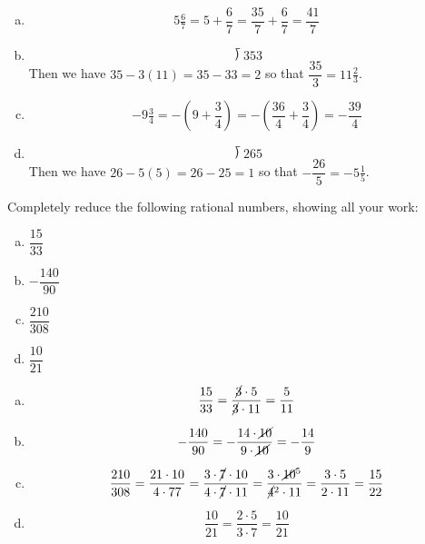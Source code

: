 \documentclass[11pt,letterpaper]{article}
\begin{document}
\sol
\begin{enumerate}[(a)]
\item 
	\[
	5 \tfrac{6}{7}= 5 + \dfrac{6}{7}= \dfrac{35}{7} + \dfrac{6}{7}= \dfrac{41}{7}
	\] \pspace

\item 
	\[
	\longdivision{35}{3}
	\] 
Then we have $35 - 3(11)= 35 - 33= 2$ so that $\dfrac{35}{3}= 11 \tfrac{2}{3}$. \pspace

\item 
	\[
	-9 \tfrac{3}{4}= -\left( 9 + \dfrac{3}{4} \right)= -\left( \dfrac{36}{4} + \dfrac{3}{4} \right)= -\dfrac{39}{4}
	\] \pspace

\item 
	\[
	\longdivision{26}{5}
	\] 
Then we have $26 - 5(5)= 26 - 25= 1$ so that $-\dfrac{26}{5}= -5 \tfrac{1}{5}$.
\end{enumerate}



\newpage



 Completely reduce the following rational numbers, showing all your work:
	\begin{enumerate}[(a)]
	\item $\dfrac{15}{33}$
	\item $-\dfrac{140}{90}$
	\item $\dfrac{210}{308}$
	\item $\dfrac{10}{21}$
	\end{enumerate} \pspace

\sol
\begin{enumerate}[(a)]
\item 
	\[
	\dfrac{15}{33}= \dfrac{\cancel{3} \cdot 5}{\cancel{3} \cdot 11}= \dfrac{5}{11}
	\] \pspace

\item 
	\[
	-\dfrac{140}{90}= -\dfrac{14 \cdot \cancel{10}}{9 \cdot \cancel{10}}= -\dfrac{14}{9}
	\] \pspace

\item 
	\[
	\dfrac{210}{308}= \dfrac{21 \cdot 10}{4 \cdot 77}= \dfrac{3 \cdot \cancel{7} \cdot 10}{4 \cdot \cancel{7} \cdot 11}= \dfrac{3 \cdot \cancel{10}^5}{\cancel{4}^2 \cdot 11}= \dfrac{3 \cdot 5}{2 \cdot 11}= \dfrac{15}{22}
	\] \pspace

\item 
	\[
	\dfrac{10}{21}= \dfrac{2 \cdot 5}{3 \cdot 7}= \dfrac{10}{21}
	\] 
\end{enumerate}
\end{document}
